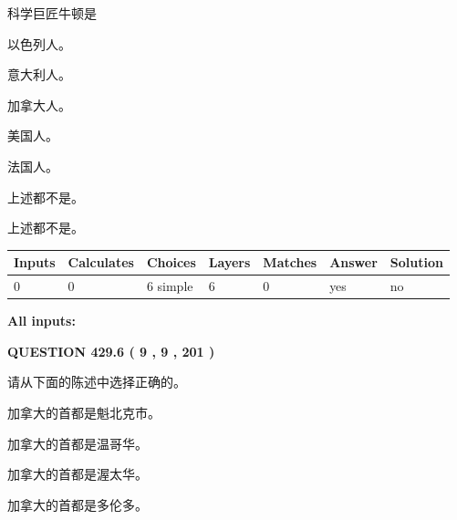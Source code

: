 \documentclass{ctexart}
\begin{document}
  
科学巨匠牛顿是
 
 
以色列人。
 
 
意大利人。
 
 
加拿大人。
 
 
美国人。
 
 
法国人。
 
 
 上述都不是。
 
 
\noindent{}
 
 
 上述都不是。
 
 
\noindent{}
 
 
   
   
   
   
\noindent\begin{tabular}{|l|l|l|l|l|l|l|}
 \hline
Inputs & Calculates & Choices & Layers & Matches & Answer & Solution \\ \hline
 0  & 
 0  & 
 6
  simple  
  & 
 6  & 
 0  & 
  yes & 
  no 
  \\ \hline
 \end{tabular}
   
   
   
   
\noindent{}
   
   
   
   
\noindent\vspace{0.1in}\hspace{-0.08in} {\textbf{\Large{All inputs: }}}
   
   
  
\vspace{0.2in}
  
{\textbf{\Large{QUESTION
429.6 
 ( 9 , 9 , 201 )
}}}
  
  
请从下面的陈述中选择正确的。
 
 
加拿大的首都是魁北克市。
 
 
加拿大的首都是温哥华。
 
 
加拿大的首都是渥太华。
 
 
加拿大的首都是多伦多。
 
\end{document}
